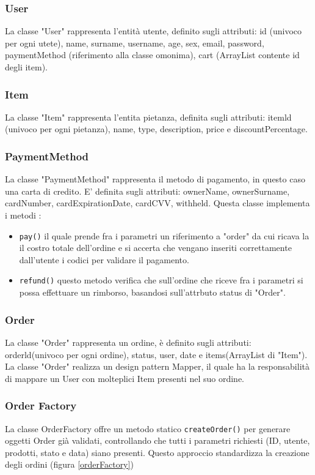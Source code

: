 \documentclass{article}
\begin{document}
\subsubsection{User}
La classe "User" rappresenta l'entità utente, definito sugli attributi: id (univoco per ogni utete), name, surname, username, age, sex, email, password, paymentMethod (riferimento alla classe omonima), cart (ArrayList contente id degli item).

\subsubsection{Item}
La classe "Item" rappresenta l'entita pietanza, definita sugli attributi: itemld (univoco per ogni pietanza), name, type, description, price e discountPercentage.

\subsubsection{PaymentMethod}
La classe "PaymentMethod" rappresenta il metodo di pagamento, in questo caso una carta di credito. E' definita sugli attributi: ownerName, ownerSurname, cardNumber, cardExpirationDate, cardCVV, withheld. Questa classe implementa i metodi : 

\begin{itemize}
    \item \texttt{pay()} il quale prende fra i parametri un riferimento a "order" da cui ricava la il costro totale dell'ordine e si accerta che vengano inseriti correttamente dall'utente i codici per validare il pagamento.

    \item \texttt{refund()} questo metodo verifica che sull'ordine che riceve fra i parametri si possa effettuare un rimborso, basandosi sull'attrbuto status di "Order".
\end{itemize}

\subsubsection{Order}
La classe "Order" rappresenta un ordine, è definito sugli attributi: orderld(univoco per ogni ordine), status, user, date e items(ArrayList di "Item"). La classe "Order" realizza un design pattern Mapper, il quale ha la responsabilità di mappare un User con molteplici Item presenti nel suo ordine.

\subsubsection{Order Factory}
La classe OrderFactory offre un metodo statico \texttt{createOrder()} per generare oggetti Order già validati, controllando che tutti i parametri richiesti (ID, utente, prodotti, stato e data) siano presenti. Questo approccio standardizza la creazione degli ordini (figura \ref{orderFactory})
\end{document}
